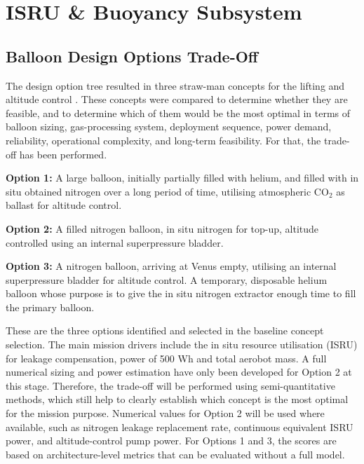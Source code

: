 \chapter{ISRU \& Buoyancy Subsystem}\label{chap:ISRU}



\section{Balloon Design Options Trade-Off}
\label{sec:balloon_design_options_tradeoff}

The design option tree resulted in three straw-man concepts for the lifting and altitude control \cite{baseline_vista}. These concepts were compared to determine whether they are feasible, and to determine which of them would be the most optimal in terms of balloon sizing, gas-processing system, deployment sequence, power demand, reliability, operational complexity, and long-term feasibility. For that, the trade-off has been performed.

\textbf{Option 1:} A large balloon, initially partially filled with helium, and filled with in situ obtained nitrogen over a long period of time, utilising atmospheric CO$_2$ as ballast for altitude control.

\textbf{Option 2:} A filled nitrogen balloon, in situ nitrogen for top-up, altitude controlled using an internal superpressure bladder.

\textbf{Option 3:} A nitrogen balloon, arriving at Venus empty, utilising an internal superpressure bladder for altitude control. A temporary, disposable helium balloon whose purpose is to give the in situ nitrogen extractor enough time to fill the primary balloon.

These are the three options identified and selected in the baseline concept selection. The main mission drivers include the in situ resource utilisation (ISRU) for leakage compensation, power of 500 Wh and total aerobot mass. A full numerical sizing and power estimation have only been developed for Option 2 at this stage. Therefore, the trade-off will be performed using semi-quantitative methods, which still help to clearly establish which concept is the most optimal for the mission purpose. Numerical values for Option 2 will be used where available, such as nitrogen leakage replacement rate, continuous equivalent ISRU power, and altitude-control pump power. For Options 1 and 3, the scores are based on architecture-level metrics that can be evaluated without a full model.

